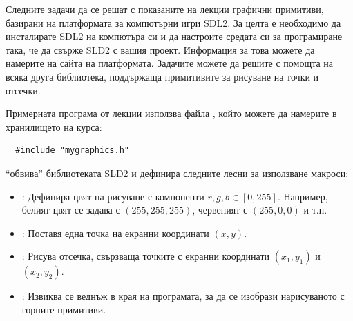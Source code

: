 {  \begin{mdframed}[hidealllines=true,backgroundcolor=gray!20]

  Следните задачи да се решат с показаните на лекции графични примитиви, базирани на платформата за компютърни игри SDL2. За целта е необходимо да инсталирате SDL2 на компютъра си и да настроите средата си за програмиране така, че да свърже SLD2 с вашия проект. Информация за това можете да намерите на сайта на платформата.
	Задачите можете да решите с помощта на всяка друга библиотека, поддържаща примитивите за рисуване на точки и отсечки.

  Примерната програма от лекции използва файла , който можете да намерите в \href{https://github.com/stranxter/lecture-notes/tree/master/samples/01_programming%20101/2018/pixels}{\underline{хранилището на курса}}:
  \begin{mdframed}[hidealllines=true,backgroundcolor=lightgray!20]
  \begin{verbatim}
  #include "mygraphics.h"
  \end{verbatim}
  \end{mdframed}

   ``обвива'' библиотеката SLD2 и дефинира следните лесни за използване макроси:

  \begin{itemize}
    \item {}: Дефинира цвят на рисуване с компоненти $r,g,b\in[0,255]$. Например, белият цвят се задава с $(255,255,255)$, червеният с $(255,0,0)$ и т.н.
    \item {}: Поставя една точка на екранни координати $(x,y)$.
    \item {}: Рисува отсечка, свързваща точките с екранни координати $(x_1,y_1)$ и $(x_2,y_2)$.
    \item {}: Извиква се веднъж в края на програмата, за да се изобрази нарисуваното с горните примитиви.
  \end{itemize}
\end{mdframed}

}
